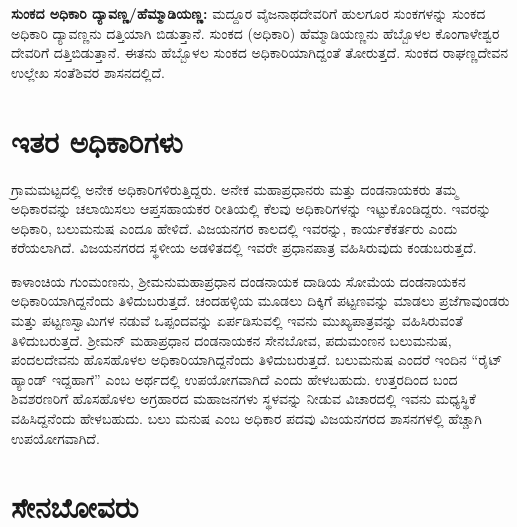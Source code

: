\textbf{ಸುಂಕದ ಅಧಿಕಾರಿ ದ್ಯಾವಣ್ಣ/ಹೆಮ್ಮಾಡಿಯಣ್ಣ:} ಮದ್ದೂರ ವೈಜನಾಥದೇವರಿಗೆ ಹುಲಗೂರ ಸುಂಕಗಳನ್ನು ಸುಂಕದ ಅಧಿಕಾರಿ ದ್ಯಾವಣ್ಣನು ದತ್ತಿಯಾಗಿ ಬಿಡುತ್ತಾನೆ. ಸುಂಕದ (ಅಧಿಕಾರಿ) ಹೆಮ್ಮಾಡಿಯಣ್ಣನು ಹೆಬ್ಬೊಳಲ ಕೊಂಗಾಳೇಶ್ವರ ದೇವರಿಗೆ ದತ್ತಿಬಿಡುತ್ತಾನೆ. ಈತನು ಹೆಬ್ಬೊಳಲ ಸುಂಕದ ಅಧಿಕಾರಿಯಾಗಿದ್ದಂತೆ ತೋರುತ್ತದೆ. ಸುಂಕದ ರಾಘಣ್ಣದೇವನ ಉಲ್ಲೇಖ ಸಂತೆಶಿವರ ಶಾಸನದಲ್ಲಿದೆ.

\vskip 4pt

\section{ಇತರ ಅಧಿಕಾರಿಗಳು}

ಗ್ರಾಮಮಟ್ಟದಲ್ಲಿ ಅನೇಕ ಅಧಿಕಾರಿಗಳಿರುತ್ತಿದ್ದರು. ಅನೇಕ ಮಹಾಪ್ರಧಾನರು ಮತ್ತು ದಂಡನಾಯಕರು ತಮ್ಮ ಅಧಿಕಾರವನ್ನು ಚಲಾಯಿಸಲು ಆಪ್ತಸಹಾಯಕರ ರೀತಿಯಲ್ಲಿ ಕೆಲವು ಅಧಿಕಾರಿಗಳನ್ನು ಇಟ್ಟುಕೊಂಡಿದ್ದರು. ಇವರನ್ನು ಅಧಿಕಾರಿ, ಬಲುಮನುಷ ಎಂದೂ ಹೇಳಿದೆ. ವಿಜಯನಗರ ಕಾಲದಲ್ಲಿ ಇವರನ್ನು, ಕಾರ್ಯಕೆಕರ್ತರು ಎಂದು ಕರೆಯಲಾಗಿದೆ. ವಿಜಯನಗರದ ಸ್ಥಳೀಯ ಅಡಳಿತದಲ್ಲಿ ಇವರೇ ಪ್ರಧಾನಪಾತ್ರ ವಹಿಸಿರುವುದು ಕಂಡುಬರುತ್ತದೆ.

\vskip 2pt

ಕಾಳಾಂಚಿಯ ಗುಂಮಂಣನು, ಶ‍್ರೀಮನುಮಹಾಪ್ರಧಾನ ದಂಡನಾಯಕ ದಾಡಿಯ ಸೋಮೆಯ ದಂಡನಾಯಕನ ಅಧಿಕಾರಿಯಾಗಿದ್ದನೆಂದು ತಿಳಿದುಬರುತ್ತದೆ. ಚಂದಹಳ್ಳಿಯ ಮೂಡಲು ದಿಕ್ಕಿಗೆ ಪಟ್ಟಣವನ್ನು ಮಾಡಲು ಪ್ರಜೆಗಾವುಂಡರು ಮತ್ತು ಪಟ್ಟಣಸ್ವಾಮಿಗಳ ನಡುವೆ ಒಪ್ಪಂದವನ್ನು ಏರ್ಪಡಿಸುವಲ್ಲಿ ಇವನು ಮುಖ್ಯಪಾತ್ರವನ್ನು ವಹಿಸಿರುವಂತೆ ತಿಳಿದುಬರುತ್ತದೆ. ಶ‍್ರೀಮನ್​ ಮಹಾಪ್ರಧಾನ ದಂಡನಾಯಕನ ಸೇನಬೋವ, ಪದುಮಂಣನ ಬಲುಮನುಷ, ಪಂದಲದೇವನು ಹೊಸಹೊಳಲ ಅಧಿಕಾರಿಯಾಗಿದ್ದನೆಂದು ತಿಳಿದುಬರುತ್ತದೆ. ಬಲುಮನುಷ ಎಂದರೆ ಇಂದಿನ “ರೈಟ್​ ಹ್ಯಾಂಡ್​ ಇದ್ದಹಾಗೆ” ಎಂಬ ಅರ್ಥದಲ್ಲಿ ಉಪಯೋಗವಾಗಿದೆ ಎಂದು ಹೇಳಬಹುದು. ಉತ್ತರದಿಂದ ಬಂದ ಶಿವಶರಣರಿಗೆ ಹೊಸಹೊಳಲ ಅಗ್ರಹಾರದ ಮಹಾಜನಗಳು ಸ್ಥಳವನ್ನು ನೀಡುವ ವಿಚಾರದಲ್ಲಿ ಇವನು ಮಧ್ಯಸ್ಥಿಕೆ ವಹಿಸಿದ್ದನೆಂದು ಹೇಳಬಹುದು. ಬಲು ಮನುಷ ಎಂಬ ಅಧಿಕಾರ ಪದವು ವಿಜಯನಗರದ ಶಾಸನಗಳಲ್ಲಿ ಹೆಚ್ಚಾಗಿ ಉಪಯೋಗವಾಗಿದೆ.

\vskip 2pt

\section{ಸೇನಬೋವರು}

